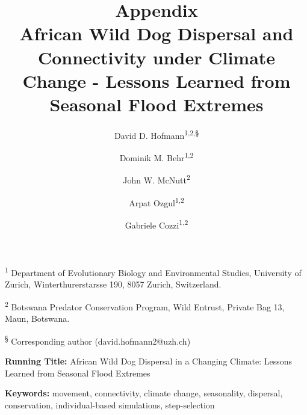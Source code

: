 \documentclass[abstract=on,10pt,a4paper,bibliography=totocnumbered]{article}
\title{\textbf{Appendix}\\ African Wild Dog Dispersal and Connectivity under
Climate Change - Lessons Learned from Seasonal Flood Extremes}
\author{
  David D. Hofmann\textsuperscript{1,2,\S} \orcid{0000-0003-3477-4365} \and
  Dominik M. Behr\textsuperscript{1,2} \orcid{0000-0001-7378-8538} \and
  John W. McNutt\textsuperscript{2} \and
  Arpat Ozgul\textsuperscript{1,2} \orcid{0000-0001-7477-2642} \and
  Gabriele Cozzi\textsuperscript{1,2} \orcid{0000-0002-1744-1940}
}
\newcommand{\beginappendix}{%
  \setcounter{table}{0}
  \renewcommand{\thetable}{S\arabic{table}}%
  \setcounter{figure}{0}
  \renewcommand{\thefigure}{S\arabic{figure}}%
  \setcounter{equation}{0}
  \renewcommand{\theequation}{Equation S\arabic{equation}}%
  \setcounter{section}{0}
  \renewcommand{\thesection}{A.\arabic{section}}%
}
\renewcommand{\theequation}{Equation \arabic{equation}}%
\begin{document}



\maketitle

\begin{flushleft}

\vspace{0.5cm}

\textsuperscript{1} Department of Evolutionary Biology and Environmental
Studies, University of Zurich, Winterthurerstarsse 190, 8057 Zurich,
Switzerland.

\textsuperscript{2} Botswana Predator Conservation Program, Wild Entrust,
Private Bag 13, Maun, Botswana.

\textsuperscript{\S} Corresponding author (david.hofmann2@uzh.ch)

\vspace{4cm}

\textbf{Running Title:} African Wild Dog Dispersal in a Changing Climate:
Lessons Learned from Seasonal Flood Extremes

\vspace{0.5cm}

\textbf{Keywords:} movement, connectivity, climate change, seasonality,
dispersal, conservation, individual-based simulations, step-selection

\end{flushleft}

\newpage



\appendix
\beginappendix

\newpage
\end{document}
